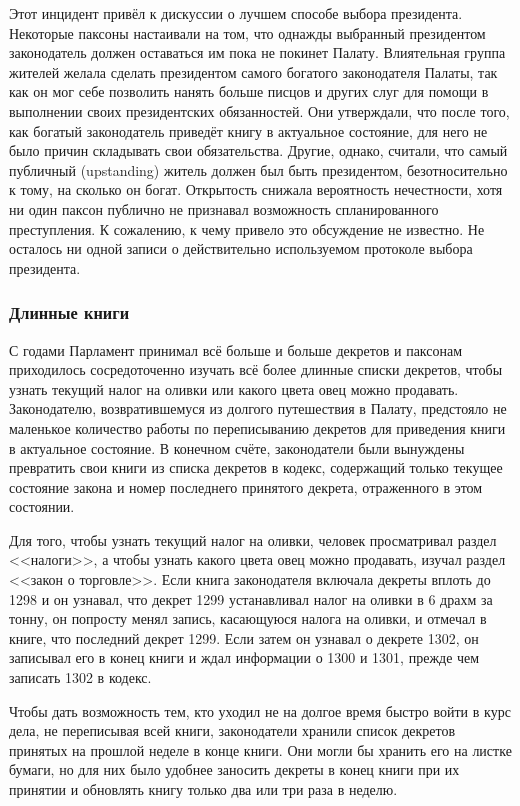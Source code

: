 \documentclass[12pt, a4paper]{article} %
\begin{document}
Этот инцидент привёл к дискуссии о лучшем способе выбора президента. Некоторые паксоны настаивали на том, что однажды выбранный президентом законодатель должен оставаться им пока не покинет Палату. Влиятельная группа жителей желала сделать президентом самого богатого законодателя Палаты, так как он мог себе позволить нанять больше писцов и других слуг для помощи в выполнении своих президентских обязанностей. Они утверждали, что после того, как богатый законодатель приведёт книгу в актуальное состояние, для него не было причин складывать свои обязательства. Другие, однако, считали, что самый публичный (upstanding) житель должен был быть президентом, безотносительно к тому, на сколько он богат. Открытость снижала вероятность нечестности, хотя ни один паксон публично не признавал возможность спланированного преступления. К сожалению, к чему привело это обсуждение не известно. Не осталось ни одной записи о действительно используемом протоколе выбора президента.

\subsubsection{Длинные книги}

С годами Парламент принимал всё больше и больше декретов и паксонам приходилось сосредоточенно изучать всё более длинные списки декретов, чтобы узнать текущий налог на оливки или какого цвета овец можно продавать. Законодателю, возвратившемуся из долгого путешествия в Палату, предстояло не маленькое количество работы по переписыванию декретов для приведения книги в актуальное состояние. В конечном счёте, законодатели были вынуждены превратить свои книги из списка декретов в кодекс, содержащий только текущее состояние закона и номер последнего принятого декрета, отраженного в этом состоянии.

Для того, чтобы узнать текущий налог на оливки, человек просматривал раздел <<налоги>>, а чтобы узнать какого цвета овец можно продавать, изучал раздел <<закон о торговле>>. Если книга законодателя включала декреты вплоть до 1298 и он узнавал, что декрет 1299 устанавливал налог на оливки в 6 драхм за тонну, он попросту менял запись, касающуюся налога на оливки, и отмечал в книге, что последний декрет 1299. Если затем он узнавал о декрете 1302, он записывал его в конец книги и ждал информации о 1300 и 1301, прежде чем записать 1302 в кодекс.

Чтобы дать возможность тем, кто уходил не на долгое время быстро войти в курс дела, не переписывая всей книги, законодатели хранили список декретов принятых на прошлой неделе в конце книги. Они могли бы хранить его на листке бумаги, но для них было удобнее заносить декреты в конец книги при их принятии и обновлять книгу только два или три раза в неделю.
\end{document}
